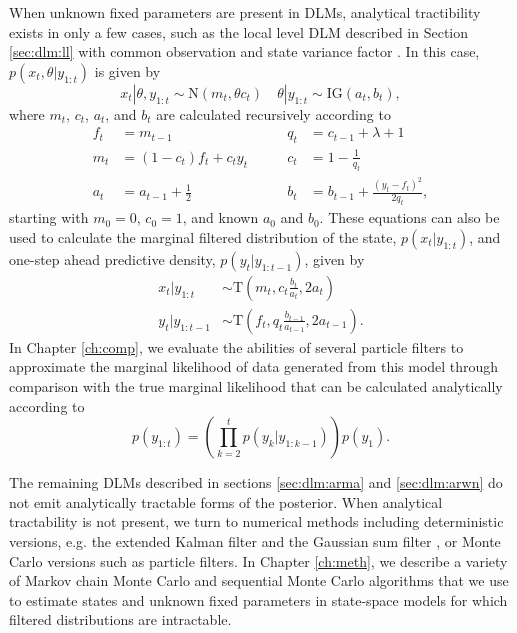 When unknown fixed parameters are present in DLMs, analytical tractibility exists in only a few cases, such as the local level DLM described in Section \ref{sec:dlm:ll} with common observation and state variance factor \cite[Section 4.3][]{petris:camp:2009:dynamic}. In this case, $p(x_t,\theta|y_{1:t})$ is given by
\begin{equation}
x_t|\theta,y_{1:t} \sim \mbox{N}(m_t,\theta c_t) \quad \theta|y_{1:t} \sim \mbox{IG}(a_t, b_t), \label{eqn:ll:post}
\end{equation}
where $m_t$, $c_t$, $a_t$, and $b_t$ are calculated recursively according to
\begin{align}
f_t &= m_{t-1} &\qquad q_t &= c_{t-1} + \lambda + 1 \label{eqn:ll:kal} \\
m_t &= (1 - c_t)f_t + c_ty_t &\qquad c_t &= 1 - \frac{1}{q_t} \nonumber \\
a_t &= a_{t-1} + \frac{1}{2} &\qquad b_t &= b_{t-1} + \frac{(y_t-f_t)^2}{2q_t}, \nonumber
\end{align}
starting with $m_0 = 0$, $c_0 = 1$, and known $a_0$ and $b_0$. These equations can also be used to calculate the marginal filtered distribution of the state, $p(x_t|y_{1:t})$, and one-step ahead predictive density, $p(y_t|y_{1:t-1})$, given by
\begin{align}
x_t|y_{1:t} &\sim \mbox{T}\left(m_t,c_t \frac{b_t}{a_t},2a_t\right) \label{eqn:ll:marg} \\
y_t|y_{1:t-1} &\sim \mbox{T}\left(f_t,q_t \frac{b_{t-1}}{a_{t-1}},2a_{t-1}\right). \label{eqn:ll:onestep}
\end{align}
In Chapter \ref{ch:comp}, we evaluate the abilities of several particle filters to approximate the marginal likelihood of data generated from this model through comparison with the true marginal likelihood that can be calculated analytically according to
\begin{equation}
p(y_{1:t}) = \left(\prod_{k=2}^t p(y_k|y_{1:k-1})\right)p(y_1) \label{eqn:ll:marglik}.
\end{equation}

The remaining DLMs described in sections \ref{sec:dlm:arma} and \ref{sec:dlm:arwn} do not emit analytically tractable forms of the posterior. When analytical tractability is not present, we turn to numerical methods including deterministic versions, e.g. the extended Kalman filter \cite[Section 1.6][]{hay:2001:kal} and the Gaussian sum filter \citep{Alsp:Sore:nonl:1972}, or Monte Carlo versions such as particle filters. In Chapter \ref{ch:meth}, we describe a variety of Markov chain Monte Carlo and sequential Monte Carlo algorithms that we use to estimate states and unknown fixed parameters in state-space models for which filtered distributions are intractable. 
